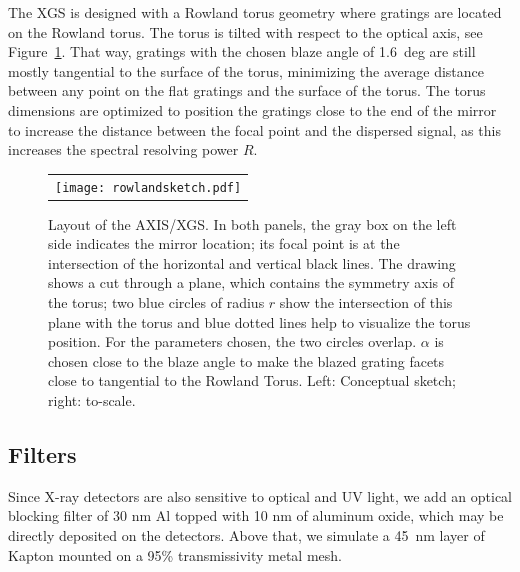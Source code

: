 \documentclass[12pt]{spieman}  %
\begin{document}
\begin{spacing}{1}
The XGS is designed with a Rowland torus
geometry\cite{Beuermann:78} where gratings are located on the
Rowland torus. The torus is tilted with respect to the optical axis\cite{doi:10.1117/12.856482,doi:10.1117/12.2273011}, see Figure~\ref{fig:sketch}. That way, gratings with the chosen blaze angle of 1.6~deg are still mostly tangential to the surface of the torus, minimizing the average distance between any point on the flat gratings and the surface of the torus. The torus dimensions are optimized to position the gratings close to the end of the mirror to increase the distance between the focal point and the dispersed signal, as this increases the spectral resolving power $R$.

\begin{figure} [ht]
\begin{center}
\begin{tabular}{c} %
\texttt{[image: rowlandsketch.pdf]}
\end{tabular}
\end{center}
\caption {\label{fig:sketch}
Layout of the AXIS/XGS. In both panels, the gray box on the left side indicates the mirror location; its focal point is at the intersection of the horizontal and vertical black lines. The drawing shows a cut through a plane, which contains the symmetry axis of the torus; two blue circles of radius $r$ show the intersection of this plane with the torus and blue dotted lines help to visualize the torus position. For the parameters chosen, the two circles overlap. $\alpha$ is chosen close to the blaze angle to make the blazed grating facets close to tangential to the Rowland Torus. Left: Conceptual sketch; right: to-scale.
}
\end{figure}

\subsection{Filters}

Since X-ray detectors are also sensitive to optical and UV light, we add an optical blocking filter of 30 nm Al topped with 10 nm of aluminum oxide, which may be directly deposited on the detectors. Above that, we simulate a 45~nm layer of Kapton mounted on a 95\% transmissivity metal mesh.



\end{spacing}
\end{document}
